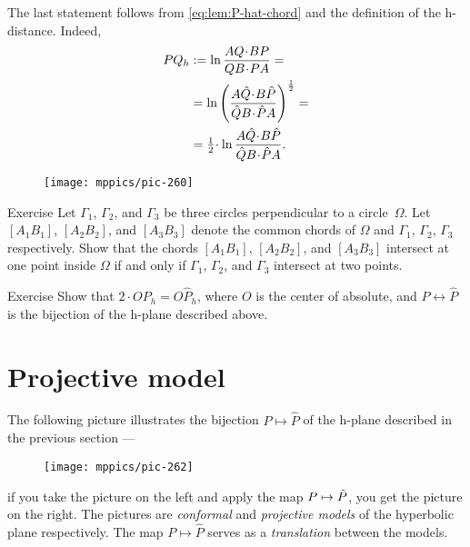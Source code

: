The last statement follows from \ref{eq:lem:P-hat-chord} and the definition of the h-distance.
Indeed,
\begin{align*}
PQ_h&\df\ln\frac{A Q\cdot B P}{QB\cdot PA}=
\\
&=\ln\left(\frac{A \hat Q\cdot B \hat P}{\hat QB\cdot \hat PA}\right)^{\frac12}=
\\
&=\tfrac12\cdot\ln\frac{A \hat Q\cdot B \hat P}{\hat QB\cdot \hat PA}.
\end{align*}
\qedsf

{

\begin{wrapfigure}[8]{r}{36mm}
\centering
\vskip-8mm
\texttt{[image: mppics/pic-260]}
\end{wrapfigure}

\begin{thm}{Exercise}\label{ex:hex}
Let $\Gamma_1$, $\Gamma_2$, and $\Gamma_3$ 
be three circles perpendicular to a circle~$\Omega$.
Let $[A_1B_1]$, $[A_2B_2]$, and $[A_3B_3]$ denote
the common chords of $\Omega$ and $\Gamma_1$, $\Gamma_2$, $\Gamma_3$ respectively.
Show that the chords $[A_1B_1]$, $[A_2B_2]$, and $[A_3B_3]$ intersect at one point inside $\Omega$ if and only if $\Gamma_1$, $\Gamma_2$, and $\Gamma_3$ intersect at two points.
\end{thm}

\begin{thm}{Exercise}\label{ex:P<->hatP}
Show that $2\cdot OP_h=O\hat P_h$, where $O$ is the center of absolute, and $P\leftrightarrow \hat P$ is the bijection of the h-plane described above.
\end{thm}


}

\section{Projective model}
\label{sec:proj-model}

The following picture illustrates the bijection $P\mapsto \hat P$ of the h-plane described in the previous section --- 
\begin{figure}[!ht]
\centering
\texttt{[image: mppics/pic-262]}
\end{figure}
if you take the picture on the left and apply the map $P\mapsto \hat P$,
you get the picture on the right.
The pictures are {}\emph{conformal} and \emph{projective models} of the hyperbolic plane respectively.
The map $P\mapsto \hat P$ serves as a \textit{translation} between the models.

